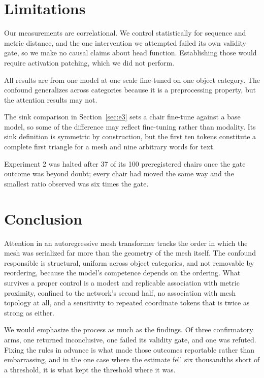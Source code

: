 \documentclass[conference]{IEEEtran}
\begin{document}
\section{Limitations}

Our measurements are correlational. We control statistically for sequence and
metric distance, and the one intervention we attempted failed its own validity
gate, so we make no causal claims about head function. Establishing those would
require activation patching, which we did not perform.

All results are from one model at one scale fine-tuned on one object category. The
confound generalizes across categories because it is a preprocessing property, but
the attention results may not.

The sink comparison in Section~\ref{sec:e3} sets a chair fine-tune against a base
model, so some of the difference may reflect fine-tuning rather than modality. Its
sink definition is symmetric by construction, but the first ten tokens constitute
a complete first triangle for a mesh and nine arbitrary words for text.

Experiment 2 was halted after 37 of its 100 preregistered chairs once the gate
outcome was beyond doubt; every chair had moved the same way and the smallest ratio
observed was six times the gate.

\section{Conclusion}

Attention in an autoregressive mesh transformer tracks the order in which the mesh
was serialized far more than the geometry of the mesh itself. The confound
responsible is structural, uniform across object categories, and not removable by
reordering, because the model's competence depends on the ordering. What survives
a proper control is a modest and replicable association with metric proximity,
confined to the network's second half, no association with mesh topology at all,
and a sensitivity to repeated coordinate tokens that is twice as strong as either.

We would emphasize the process as much as the findings. Of three confirmatory
arms, one returned inconclusive, one failed its validity gate, and one was
refuted. Fixing the rules in advance is what made those outcomes reportable rather
than embarrassing, and in the one case where the estimate fell six thousandths
short of a threshold, it is what kept the threshold where it was.



\end{document}
